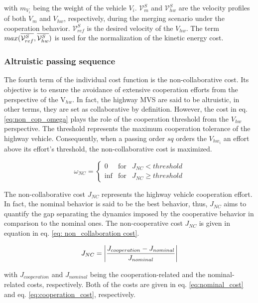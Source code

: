 \begin{enumerate}[(a)]
with $m_{V_{i}}$ being the weight of the vehicle $V_i$. $\mathcal{V}_{m}^{S}$ and $\mathcal{V}_{hw}^{S}$ are the velocity profiles of both $V_m$ and $V_{hw}$, respectively,  during the merging scenario under the cooperation behavior. $\mathcal{V}_{ref}^S$ is the desired velocity of the $V_{hw}$. The term ${\tiny{max}({\overline{\mathcal{V}_{ref}^{S}}, \overline{\mathcal{V}^{S}_{hw}}})}$ is used for the normalization of the kinetic energy cost.




\subsubsection{Altruistic passing sequence}\label{sec:altruistic_passing_sequence}
The fourth term of the individual cost function is the non-collaborative cost. Its objective is to ensure the avoidance of extensive cooperation efforts from the perspective of the V$_{hw}$. In fact, the highway MVS are said to be altruistic, in other terms, they are set as collaborative by definition. However, the  cost in eq. \ref{eq:non_cop_omega} plays the role of the cooperation threshold from the $V_{hw}$ perspective. The threshold represents the maximum cooperation tolerance of the highway vehicle. Consequently, when a passing order $sq$ orders the $V_{hw_i}$ an effort above its effort's threshold, the non-collaborative cost is maximized.

\begin{equation} \label{eq:non_cop_omega}
    \omega_{NC} = \left\{ \begin{array}{rcl}
0 & \mbox{for}
& J_{NC}< threshold \\ 
\inf & \mbox{for} & J_{NC}  \geq threshold
\end{array}\right.
\end{equation}

 The non-collaborative cost $J_{NC}$ represents the highway vehicle cooperation effort. In fact, the nominal behavior is said to be the best behavior, thus, $J_{NC}$ aims to quantify the gap separating the dynamics imposed by the cooperative behavior in comparison to the nominal ones.  The non-cooperative cost  $J_{NC}$ is given in equation in eq. \ref{eq: non_collaboration cost}. 

\begin{equation} \label{eq: non_collaboration cost}
    J_{NC}= \abs{\frac{J_{cooperation}-J_{nominal}}{J_{nominal}}}
\end{equation}

with $J_{cooperation}$ and $J_{nominal}$ being the cooperation-related and the nominal-related costs, respectively. Both of the costs are given in eq. \ref{eq:nominal_cost} and eq. \ref{eq:cooperation_cost}, respectively. 


\end{enumerate}
